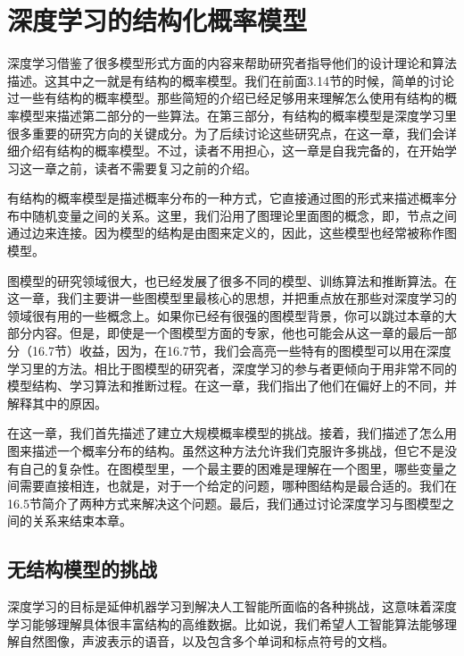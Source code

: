 ﻿\chapter{深度学习的结构化概率模型}
\label{chap:16}
深度学习借鉴了很多模型形式方面的内容来帮助研究者指导他们的设计理论和算法描述。这其中之一就是有结构的概率模型。我们在前面3.14节的时候，简单的讨论过一些有结构的概率模型。那些简短的介绍已经足够用来理解怎么使用有结构的概率模型来描述第二部分的一些算法。在第三部分，有结构的概率模型是深度学习里很多重要的研究方向的关键成分。为了后续讨论这些研究点，在这一章，我们会详细介绍有结构的概率模型。不过，读者不用担心，这一章是自我完备的，在开始学习这一章之前，读者不需要复习之前的介绍。

有结构的概率模型是描述概率分布的一种方式，它直接通过图的形式来描述概率分布中随机变量之间的关系。这里，我们沿用了图理论里面图的概念，即，节点之间通过边来连接。因为模型的结构是由图来定义的，因此，这些模型也经常被称作图模型。

图模型的研究领域很大，也已经发展了很多不同的模型、训练算法和推断算法。在这一章，我们主要讲一些图模型里最核心的思想，并把重点放在那些对深度学习的领域很有用的一些概念上。如果你已经有很强的图模型背景，你可以跳过本章的大部分内容。但是，即使是一个图模型方面的专家，他也可能会从这一章的最后一部分（16.7节）收益，因为，在16.7节，我们会高亮一些特有的图模型可以用在深度学习里的方法。相比于图模型的研究者，深度学习的参与者更倾向于用非常不同的模型结构、学习算法和推断过程。在这一章，我们指出了他们在偏好上的不同，并解释其中的原因。

在这一章，我们首先描述了建立大规模概率模型的挑战。接着，我们描述了怎么用图来描述一个概率分布的结构。虽然这种方法允许我们克服许多挑战，但它不是没有自己的复杂性。在图模型里，一个最主要的困难是理解在一个图里，哪些变量之间需要直接相连，也就是，对于一个给定的问题，哪种图结构是最合适的。我们在16.5节简介了两种方式来解决这个问题。最后，我们通过讨论深度学习与图模型之间的关系来结束本章。

\section{无结构模型的挑战}
深度学习的目标是延伸机器学习到解决人工智能所面临的各种挑战，这意味着深度学习能够理解具体很丰富结构的高维数据。比如说，我们希望人工智能算法能够理解自然图像，声波表示的语音，以及包含多个单词和标点符号的文档。


